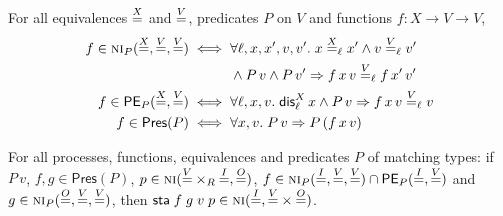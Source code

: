 \begin{definition}\label{def:side-pred}
For all equivalences $\overset{X}{=}$ and $\overset{V}{=}$, predicates $P$ on $V$ and functions
$f : X \to V \to V$,
\begin{align*}
f \in \NI_P(\eqv{X},\eqv{V},\eqv{V}) &\iff \forall \ell, x, x', v, v'.\;
  x \eqv{X}_\ell x' \wedge v \eqv{V}_\ell v' \\
  &\hphantom{{}\iff{}} \wedge P\,v \wedge P\,v' \Rightarrow f\,x\,v \eqv{V}_\ell f\,x'\,v' \\
f \in \mathsf{PE}_P(\eqv{X},\eqv{V}) &\iff \forall \ell, x, v.\;
  \dis^X_\ell\,x \wedge P\,v \Rightarrow f\,x\,v \eqv{V}_\ell v \\
f \in \mathsf{Pres}(P) &\iff \forall x, v.\; P\,v \Rightarrow P\,(f\,x\,v)
\end{align*}
\end{definition}

\begin{theorem}\label{thm:sta-pred}
For all processes, functions, equivalences and predicates $P$ of matching types: if
$P\,v$, $f, g \in \mathsf{Pres}(P)$, $p \in \text{\normalfont\scshape ni}({\overset{V}{=}} \times_R {\overset{I}{=}},\overset{O}{=})$,
$f \in \text{\normalfont\scshape ni}_P(\overset{I}{=},\overset{V}{=},\overset{V}{=}) \cap \mathsf{PE}_P(\overset{I}{=},\overset{V}{=})$ and
$g \in \text{\normalfont\scshape ni}_P(\overset{O}{=},\overset{V}{=},\overset{V}{=})$, then
$\mathsf{sta}\;f\;g\;v\;p \in \text{\normalfont\scshape ni}(\overset{I}{=},{\overset{V}{=}} \times {\overset{O}{=}})$.
\end{theorem}

\setcounter{topnumber}{1}



